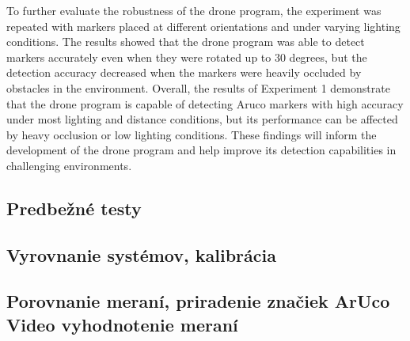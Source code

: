 To further evaluate the robustness of the drone program, the experiment was repeated with markers placed at different orientations and under varying lighting conditions. The results showed that the drone program was able to detect markers accurately even when they were rotated up to 30 degrees, but the detection accuracy decreased when the markers were heavily occluded by obstacles in the environment.
Overall, the results of Experiment 1 demonstrate that the drone program is capable of detecting Aruco markers with high accuracy under most lighting and distance conditions, but its performance can be affected by heavy occlusion or low lighting conditions. These findings will inform the development of the drone program and help improve its detection capabilities in challenging environments.
\subsection{Predbežné testy}  
\subsection{Vyrovnanie systémov, kalibrácia}  
\subsection{Porovnanie meraní, priradenie značiek ArUco Video vyhodnotenie meraní}  